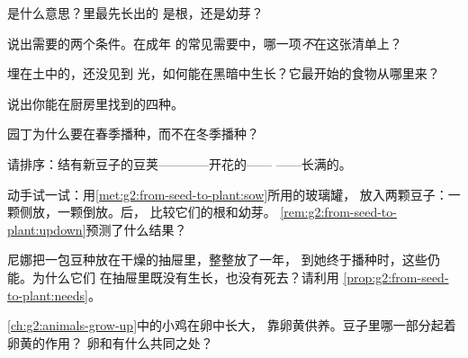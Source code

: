 \begin{exercise}[$\star$]\label{exo:g2:from-seed-to-plant:2}
\emph{}是什么意思？里最先长出的
是根，还是幼芽？
\end{exercise}

\begin{exercise}[$\star$]\label{exo:g2:from-seed-to-plant:3}
说出需要的两个条件。在成年
的常见需要中，哪一项\emph{不}在这张清单上？
\end{exercise}

\begin{exercise}[$\star$]\label{exo:g2:from-seed-to-plant:4}
埋在土中的，还没见到
光，如何能在黑暗中生长？它最开始的食物从哪里来？
\end{exercise}

\begin{exercise}[$\star$]\label{exo:g2:from-seed-to-plant:5}
说出你能在厨房里找到的四种。
\end{exercise}

\begin{exercise}[$\star$]\label{exo:g2:from-seed-to-plant:6}
园丁为什么要在春季播种，而不在冬季播种？
\end{exercise}

\begin{exercise}[$\star$]\label{exo:g2:from-seed-to-plant:7}
请排序：结有新豆子的豆荚————开花的——
——长满的。
\end{exercise}

\begin{exercise}[$\star$]\label{exo:g2:from-seed-to-plant:8}
动手试一试：用\cref{met:g2:from-seed-to-plant:sow}所用的玻璃罐，
放入两颗豆子：一颗侧放，一颗倒放。后，
比较它们的根和幼芽。
\cref{rem:g2:from-seed-to-plant:updown}预测了什么结果？
\end{exercise}

\begin{exercise}[$\star\star$]\label{exo:g2:from-seed-to-plant:9}
尼娜把一包豆种放在干燥的抽屉里，整整放了一年，
到她终于播种时，这些仍能。为什么它们
在抽屉里既没有生长，也没有死去？请利用
\cref{prop:g2:from-seed-to-plant:needs}。
\end{exercise}

\begin{exercise}[$\star\star$]\label{exo:g2:from-seed-to-plant:10}
\cref{ch:g2:animals-grow-up}中的小鸡在卵中长大，
靠卵黄供养。豆子里哪一部分起着卵黄的作用？
卵和有什么共同之处？
\end{exercise}
